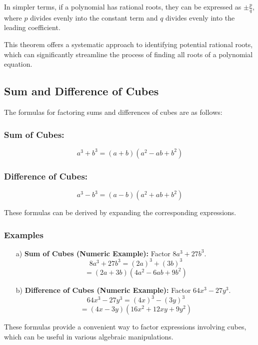 \documentclass{article}
\begin{document}
In simpler terms, if a polynomial has rational roots, they can be expressed as \( \pm \frac{p}{q} \), where \( p \) divides evenly into the constant term and \( q \) divides evenly into the leading coefficient.

This theorem offers a systematic approach to identifying potential rational roots, which can significantly streamline the process of finding all roots of a polynomial equation.

\subsection{Sum and Difference of Cubes}

The formulas for factoring sums and differences of cubes are as follows:

\subsubsection*{Sum of Cubes:}

\[ a^3 + b^3 = (a + b)(a^2 - ab + b^2) \]

\subsubsection*{Difference of Cubes:}

\[ a^3 - b^3 = (a - b)(a^2 + ab + b^2) \]

These formulas can be derived by expanding the corresponding expressions.

\subsubsection*{Examples}

\begin{enumerate}
    
    \item[a)] \textbf{Sum of Cubes (Numeric Example):} Factor \( 8a^3 + 27b^3 \).
    \[ 8a^3 + 27b^3 = (2a)^3 + (3b)^3 \]
    \[ = (2a + 3b)(4a^2 - 6ab + 9b^2) \]
    
    \item[b)] \textbf{Difference of Cubes (Numeric Example):} Factor \( 64x^3 - 27y^3 \).
    \[ 64x^3 - 27y^3 = (4x)^3 - (3y)^3 \]
    \[ = (4x - 3y)(16x^2 + 12xy + 9y^2) \]
\end{enumerate}

These formulas provide a convenient way to factor expressions involving cubes, which can be useful in various algebraic manipulations.
\newpage 
\end{document}
